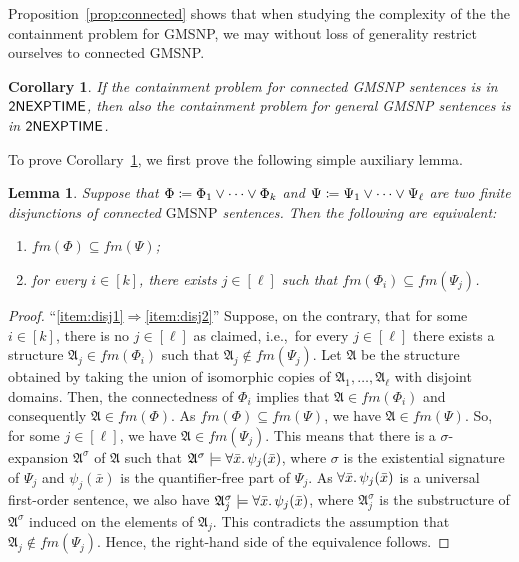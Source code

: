 \documentclass[oneside,reqno,12pt]{amsart}
\theoremstyle{plain}
\newtheorem{lemma}[thm]{Lemma}
\newtheorem{corollary}[thm]{Corollary}
\theoremstyle{remark}
\renewcommand{\coloneqq}{\mathrel{\mathop:}\mathrel{\mkern-1.2mu}=}
\newcommand{\struct}[1]{\mathfrak{#1}}
\newcommand{\fm}{\ensuremath{\mathit{fm}}\xspace}
\newcommand{\GMSNP}{\ensuremath{\mathrm{GMSNP}}\xspace}
\newcommand{\TWONEXPTIME}{{\textup{\textsf{2NEXPTIME}}}\xspace}
\begin{document}
{Proposition~\ref{prop:connected} shows that when studying the complexity of the the containment problem for GMSNP,   we may without loss of generality restrict ourselves to connected GMSNP.  


\begin{corollary}\label{cor:connected_matters_not}
    If the containment problem for connected GMSNP sentences is in $\TWONEXPTIME$, then also the containment problem for general GMSNP sentences is in $\TWONEXPTIME$.
\end{corollary}


To prove Corollary~\ref{cor:connected_matters_not}, we first prove the following simple auxiliary lemma.

\begin{lemma}\label{lem:connected}
 Suppose that $\Phi\coloneqq\Phi_1\vee\dots\vee\Phi_k$ and $\Psi\coloneqq\Psi_1\vee\dots\vee\Psi_\ell$ are two finite disjunctions of connected $\GMSNP$ sentences. 
Then the following are equivalent:
\begin{enumerate}
     \item \label{item:disj1} $\fm(\Phi)\subseteq \fm(\Psi)$;
     \item \label{item:disj2}  for every $i\in[k]$, there exists $j\in[\ell]$ such that $\fm(\Phi_i)\subseteq \fm(\Psi_j)$. 
 \end{enumerate} 
\end{lemma}   
  

\begin{proof}
``\eqref{item:disj1}$\Rightarrow$\eqref{item:disj2}'' Suppose, on the contrary, that for some $i\in[k]$, there is no $j \in [\ell]$ as claimed, i.e.,~for every $j\in[\ell]$ there exists a structure $\struct{A}_j\in\fm(\Phi_i)$ such that $\struct{A}_j\not\in\fm(\Psi_j)$.
Let $\struct{A}$ be the structure obtained by taking the union of isomorphic copies of $\struct{A}_1, \dots,\struct{A}_\ell$ with disjoint domains.
Then, the connectedness of $\Phi_i$ implies that $\struct{A}\in\fm(\Phi_i)$ and consequently $\struct{A}\in\fm(\Phi)$.
As $\fm(\Phi)\subseteq\fm(\Psi)$, we have $\struct{A}\in\fm(\Psi)$.
So, for some $j\in[\ell]$, we have $\struct{A}\in\fm(\Psi_j)$.
This means that there is a $\sigma$-expansion $\struct{A}^\sigma$ of $\struct{A}$ such that $\struct{A}^\sigma\models\forall\bar{x}\ldotp \psi_j(\bar{x})$, where $\sigma$ is the existential signature of $\Psi_j$ and $\psi_j(\bar{x})$ is the quantifier-free part of $\Psi_j$.
As $\forall\bar{x}\ldotp \psi_j(\bar{x})$ is a universal first-order sentence, we also have $\struct{A}_j^\sigma\models\forall\bar{x}\ldotp \psi_j(\bar{x})$, where $\struct{A}_j^\sigma$ is the substructure of $\struct{A}^\sigma$ induced on the elements of $\struct{A}_j$.
This contradicts the assumption that $\struct{A}_j\not\in\fm(\Psi_j)$. Hence, the right-hand side of the equivalence follows.


\end{proof}}
\end{document}

